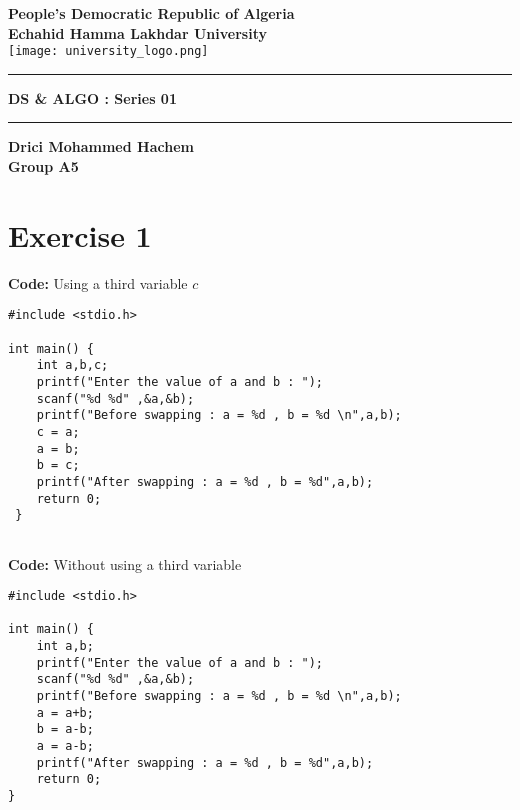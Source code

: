 \documentclass[12pt]{article}
\begin{document}
	
	\begin{titlepage}
		\centering
		\vspace*{2cm}
		
		\textbf{\Large People's Democratic Republic of Algeria}\\
		\vspace{0.5cm}
		\textbf{\large Echahid Hamma Lakhdar University}\\
		
		\vspace{1cm}
		\texttt{[image: university\_logo.png]} %
		
		\vspace{1.5cm}
		\rule{\textwidth}{1pt}
		\vspace{0.5cm}
		
		\textbf{\Large DS \& ALGO : Series 01}\\
		\vspace{0.5cm}
		\rule{\textwidth}{1pt}
		\vspace{0.5cm}
		
		\vspace{1.5cm}
		\textbf{\Huge Drici Mohammed Hachem}\\
		\vspace{0.5cm}
		\textbf{\Large Group A5}\\
		
		\vfill
	\end{titlepage}
	
	\newpage
	\section*{Exercise 1}
	 \vspace{0.5cm}
	 
	 \textbf{Code:} Using a third variable $c$
\begin{lstlisting}
#include <stdio.h>

int main() {
	int a,b,c;
	printf("Enter the value of a and b : ");
	scanf("%d %d" ,&a,&b);
	printf("Before swapping : a = %d , b = %d \n",a,b);
	c = a;
	a = b;
 	b = c;
 	printf("After swapping : a = %d , b = %d",a,b);
 	return 0;
 }
		 
\end{lstlisting}
	\vspace{1cm}
	
	 \textbf{Code:} Without using a third variable
\begin{lstlisting}
#include <stdio.h>

int main() {
	int a,b;
	printf("Enter the value of a and b : ");
	scanf("%d %d" ,&a,&b);
	printf("Before swapping : a = %d , b = %d \n",a,b);
	a = a+b;
	b = a-b;
	a = a-b;
	printf("After swapping : a = %d , b = %d",a,b);
	return 0;
}
\end{lstlisting}
\end{document}
